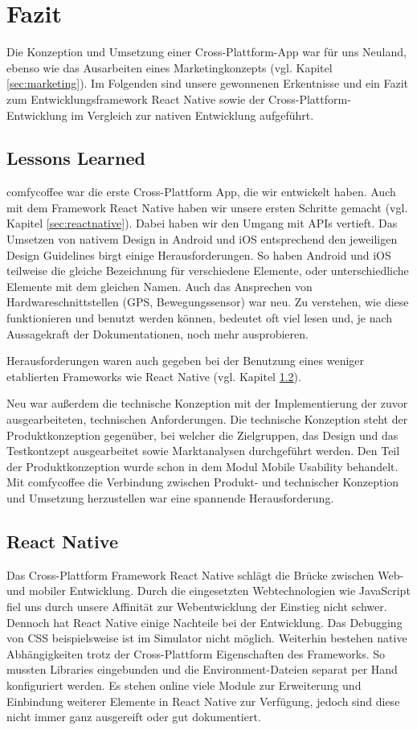 \chapter{Fazit}
\label{fazit}
Die Konzeption und Umsetzung einer Cross-Plattform-App war für uns Neuland, ebenso wie das Ausarbeiten eines Marketingkonzepts (vgl. Kapitel \ref{sec:marketing}). Im Folgenden sind unsere gewonnenen Erkentnisse und ein Fazit zum Entwicklungsframework React Native sowie der Cross-Plattform-Entwicklung im Vergleich zur nativen Entwicklung aufgeführt.

\section{Lessons Learned}
comfycoffee war die erste Cross-Plattform App, die wir entwickelt haben. Auch mit dem Framework React Native haben wir unsere ersten Schritte gemacht (vgl. Kapitel \ref{sec:reactnative}). Dabei haben wir den Umgang mit APIs vertieft. Das Umsetzen von nativem Design in Android und iOS entsprechend den jeweiligen Design Guidelines birgt einige Herausforderungen. So haben Android und iOS teilweise die gleiche Bezeichnung für verschiedene Elemente, oder unterschiedliche Elemente mit dem gleichen Namen. Auch das Ansprechen von Hardwareschnittstellen (GPS, Bewegungssensor) war neu. Zu verstehen, wie diese funktionieren und benutzt werden können, bedeutet oft viel lesen und, je nach Aussagekraft der Dokumentationen, noch mehr ausprobieren.

Herausforderungen waren auch gegeben bei der Benutzung eines weniger etablierten Frameworks wie React Native (vgl. Kapitel \ref{sec:reactnativefazit}).

Neu war außerdem die technische Konzeption mit der Implementierung der zuvor ausgearbeiteten, technischen Anforderungen. Die technische Konzeption steht der Produktkonzeption gegenüber, bei welcher die Zielgruppen, das Design und das Testkontzept ausgearbeitet sowie Marktanalysen durchgeführt werden. Den Teil der Produktkonzeption wurde schon in dem Modul Mobile Usability behandelt. Mit comfycoffee die Verbindung zwischen Produkt- und technischer Konzeption und Umsetzung herzustellen war eine spannende Herausforderung.

\section{React Native}
\label{sec:reactnativefazit}
Das Cross-Plattform Framework React Native schlägt die Brücke zwischen Web- und mobiler Entwicklung. Durch die eingesetzten Webtechnologien wie JavaScript fiel uns durch unsere Affinität zur Webentwicklung der Einstieg nicht schwer. Dennoch hat React Native einige Nachteile bei der Entwicklung. Das Debugging von CSS beispielsweise ist im Simulator nicht möglich. Weiterhin bestehen native Abhängigkeiten trotz der Cross-Plattform Eigenschaften des Frameworks. So mussten Libraries eingebunden und die Environment-Dateien separat per Hand konfiguriert werden. Es stehen online viele Module zur Erweiterung und Einbindung weiterer Elemente in React Native zur Verfügung, jedoch sind diese nicht immer ganz ausgereift oder gut dokumentiert.

